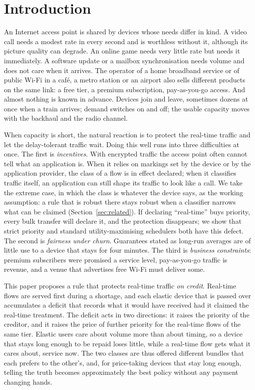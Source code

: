 \documentclass[preprint,11pt]{elsarticle}
\theoremstyle{definition}
\theoremstyle{remark}
\begin{document}
\section{Introduction}\label{sec:intro}

An Internet access point is shared by devices whose needs differ in kind.
A video call needs a modest rate in every second and is worthless without it, although its picture quality can degrade.
An online game needs very little rate but needs it immediately.
A software update or a mailbox synchronisation needs volume and does not care when it arrives.
The operator of a home broadband service or of public Wi-Fi in a caf\'e, a metro station or an airport also sells different products on the same link: a free tier, a premium subscription, pay-as-you-go access.
And almost nothing is known in advance. Devices join and leave, sometimes dozens at once when a train arrives; demand switches on and off; the usable capacity moves with the backhaul and the radio channel.

When capacity is short, the natural reaction is to protect the real-time traffic and let the delay-tolerant traffic wait.
Doing this well runs into three difficulties at once.
The first is \emph{incentives}. With encrypted traffic the access point often cannot tell what an application is. When it relies on markings set by the device or by the application provider, the class of a flow is in effect declared; when it classifies traffic itself, an application can still shape its traffic to look like a call. We take the extreme case, in which the class is whatever the device says, as the working assumption: a rule that is robust there stays robust when a classifier narrows what can be claimed (Section~\ref{sec:related}).
If declaring ``real-time'' buys priority, every bulk transfer will declare it, and the protection disappears; we show that strict priority and standard utility-maximising schedulers both have this defect.
The second is \emph{fairness under churn}. Guarantees stated as long-run averages are of little use to a device that stays for four minutes.
The third is \emph{business constraints}: premium subscribers were promised a service level, pay-as-you-go traffic is revenue, and a venue that advertises free Wi-Fi must deliver some.

This paper proposes a rule that protects real-time traffic \emph{on credit}.
Real-time flows are served first during a shortage, and each elastic device that is passed over accumulates a deficit that records what it would have received had it claimed the real-time treatment.
The deficit acts in two directions: it raises the priority of the creditor, and it raises the price of further priority for the real-time flows of the same tier.
Elastic users care about volume more than about timing, so a device that stays long enough to be repaid loses little, while a real-time flow gets what it cares about, service now.
The two classes are thus offered different bundles that each prefers to the other's, and, for price-taking devices that stay long enough, telling the truth becomes approximately the best policy without any payment changing hands.
\end{document}
